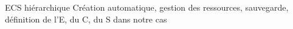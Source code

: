 
          \begin{block}{ECS hiérarchique}
          	Création automatique, gestion des ressources, sauvegarde, définition de l'E, du C, du S dans notre cas
          \end{block}